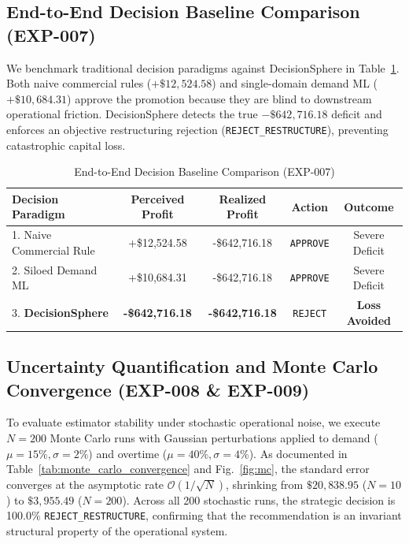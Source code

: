 \documentclass[conference]{IEEEtran}
\begin{document}
\subsection{End-to-End Decision Baseline Comparison (EXP-007)}
We benchmark traditional decision paradigms against DecisionSphere in Table~\ref{tab:baseline_comparison}. Both naive commercial rules ($+\$12,524.58$) and single-domain demand ML ($+\$10,684.31$) approve the promotion because they are blind to downstream operational friction. DecisionSphere detects the true $-\$642,716.18$ deficit and enforces an objective restructuring rejection (\texttt{REJECT\_RESTRUCTURE}), preventing catastrophic capital loss.

\begin{table}[htbp]
\caption{End-to-End Decision Baseline Comparison (EXP-007)}
\begin{center}
\begin{tabular}{lcccc}
\toprule
\textbf{Decision Paradigm} & \textbf{Perceived Profit} & \textbf{Realized Profit} & \textbf{Action} & \textbf{Outcome} \\
\midrule
1. Naive Commercial Rule & +\$12,524.58 & -\$642,716.18 & \texttt{APPROVE} & Severe Deficit \\
2. Siloed Demand ML & +\$10,684.31 & -\$642,716.18 & \texttt{APPROVE} & Severe Deficit \\
3. \textbf{DecisionSphere} & \textbf{-\$642,716.18} & \textbf{-\$642,716.18} & \texttt{REJECT} & \textbf{Loss Avoided} \\
\bottomrule
\end{tabular}
\label{tab:baseline_comparison}
\end{center}
\end{table}

\subsection{Uncertainty Quantification and Monte Carlo Convergence (EXP-008 \& EXP-009)}
To evaluate estimator stability under stochastic operational noise, we execute $N=200$ Monte Carlo runs with Gaussian perturbations applied to demand ($\mu=15\%, \sigma=2\%$) and overtime ($\mu=40\%, \sigma=4\%$). As documented in Table~\ref{tab:monte_carlo_convergence} and Fig.~\ref{fig:mc}, the standard error converges at the asymptotic rate $\mathcal{O}(1/\sqrt{N})$, shrinking from $\$20,838.95$ ($N=10$) to $\$3,955.49$ ($N=200$). Across all 200 stochastic runs, the strategic decision is 100.0\% \texttt{REJECT\_RESTRUCTURE}, confirming that the recommendation is an invariant structural property of the operational system.
\end{document}
